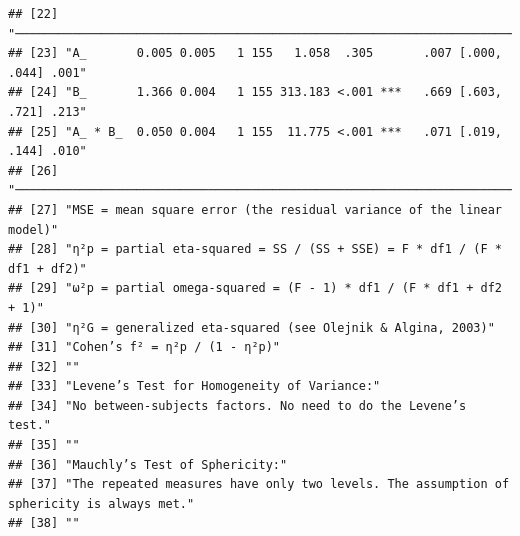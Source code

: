 \documentclass[
  man]{apa6}
\begin{document}
\begin{verbatim}
## [22] "───────────────────────────────────────────────────────────────────────"                
## [23] "A_       0.005 0.005   1 155   1.058  .305       .007 [.000, .044] .001"                
## [24] "B_       1.366 0.004   1 155 313.183 <.001 ***   .669 [.603, .721] .213"                
## [25] "A_ * B_  0.050 0.004   1 155  11.775 <.001 ***   .071 [.019, .144] .010"                
## [26] "───────────────────────────────────────────────────────────────────────"                
## [27] "MSE = mean square error (the residual variance of the linear model)"                    
## [28] "η²p = partial eta-squared = SS / (SS + SSE) = F * df1 / (F * df1 + df2)"                
## [29] "ω²p = partial omega-squared = (F - 1) * df1 / (F * df1 + df2 + 1)"                      
## [30] "η²G = generalized eta-squared (see Olejnik & Algina, 2003)"                             
## [31] "Cohen’s f² = η²p / (1 - η²p)"                                                           
## [32] ""                                                                                       
## [33] "Levene’s Test for Homogeneity of Variance:"                                             
## [34] "No between-subjects factors. No need to do the Levene’s test."                          
## [35] ""                                                                                       
## [36] "Mauchly’s Test of Sphericity:"                                                          
## [37] "The repeated measures have only two levels. The assumption of sphericity is always met."
## [38] ""
\end{verbatim}
\end{document}
